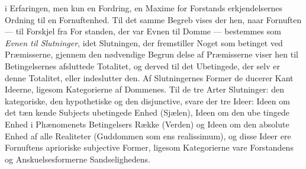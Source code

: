 \documentclass[12pt,a4paper]{book}
\begin{document}
i Erfaringen, men kun en Fordring, en Maxime for Forstands\-%
erkjendelsernes Ordning til en Fornuftenhed. Til det samme
Begreb vises der hen, naar Fornuften --- til Forskjel fra For\-%
standen, der var Evnen til Domme --- bestemmes som \emph{Evnen
til Slutninger}, idet Slutningen, der fremstiller Noget som
betinget ved Præmisserne, gjennem den nødvendige Begrun\-%
delse af Præmisserne viser hen til Betingelsernes afsluttede
Totalitet, og derved til det Ubetingede, der selv er denne
Totalitet, eller indeslutter den. Af Slutningernes Former de\-%
ducerer Kant Ideerne, ligesom Kategorierne af Dommenes.
Til de tre Arter Slutninger: den kategoriske, den hypothetiske
og den disjunctive, svare der tre Ideer: Ideen om det tæn\-%
kende Subjects ubetingede Enhed (Sjælen), Ideen om den ube\-%
tingede Enhed i Phænomenets Betingelsers Række (Verden) og
Ideen om den absolute Enhed af alle Realiteter (Guddommen
som ens realissimum), og disse Ideer ere Fornuftens aprioriske
subjective Former, ligesom Kategorierne vare Forstandens og
Anskuelsesformerne Sandselighedens.
\end{document}

